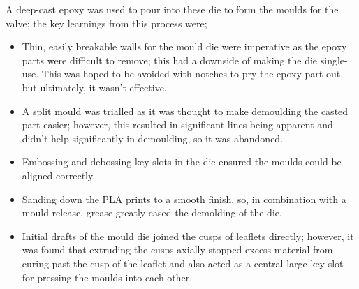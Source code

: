 A deep-cast epoxy was used to pour into these die to form the moulds for the valve; the key learnings from this process were;
\begin{itemize}
    \item Thin, easily breakable walls for the mould die were imperative as the epoxy parts were difficult to remove; this had a downside of making the die single-use. This was hoped to be avoided with notches to pry the epoxy part out, but ultimately, it wasn't effective.
    \item A split mould was trialled as it was thought to make demoulding the casted part easier; however, this resulted in significant lines being apparent and didn't help significantly in demoulding, so it was abandoned.
    \item Embossing and debossing key slots in the die ensured the moulds could be aligned correctly.
    \item Sanding down the \gls{PLA} prints to a smooth finish, so, in combination with a mould release, grease greatly eased the demolding of the die.
    \item Initial drafts of the mould die joined the cusps of leaflets directly; however, it was found that extruding the cusps axially stopped excess material from curing past the cusp of the leaflet and also acted as a central large key slot for pressing the moulds into each other.
\end{itemize}

